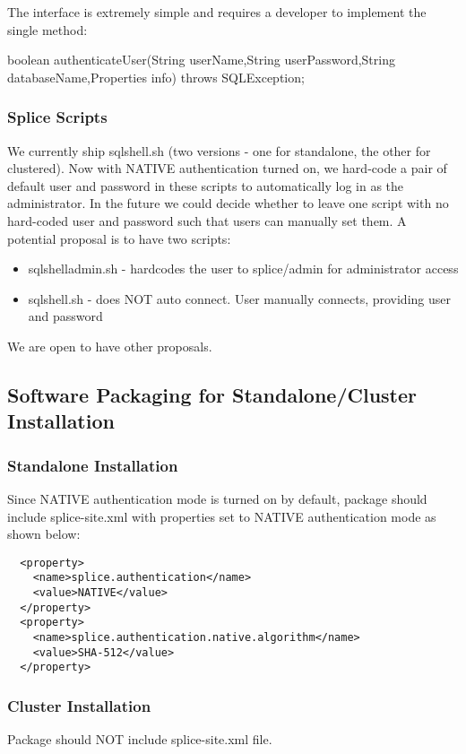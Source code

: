 The interface is extremely simple and requires a developer to implement the
single method:

boolean authenticateUser(String userName,String userPassword,String
databaseName,Properties info) throws SQLException;

\subsubsection{Splice Scripts}

We currently ship sqlshell.sh (two versions - one for standalone, the other for clustered). Now with NATIVE authentication 
turned on, we hard-code a pair of default user and password in these scripts to automatically log in as the administrator.
In the future we could decide whether to leave one script with no hard-coded user and password such that users can manually 
set them. A potential proposal is to have two scripts:  

\begin{itemize}
\item sqlshelladmin.sh - hardcodes the user to splice/admin for administrator access
\item sqlshell.sh - does NOT auto connect.  User manually connects, providing user and password
\end{itemize}

We are open to have other proposals. 

\subsection{Software Packaging for Standalone/Cluster Installation}
\subsubsection{Standalone Installation}
Since NATIVE authentication mode is turned on by default, package should include splice-site.xml with properties set to NATIVE authentication mode as shown below:
\begin{lstlisting}
  <property> 
    <name>splice.authentication</name> 
    <value>NATIVE</value> 
  </property> 
  <property> 
    <name>splice.authentication.native.algorithm</name> 
    <value>SHA-512</value> 
  </property> 
\end{lstlisting}

\subsubsection{Cluster Installation}
Package should NOT include splice-site.xml file.

